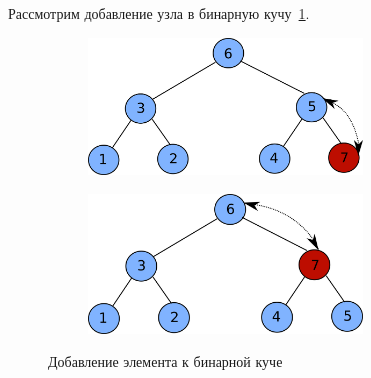 Рассмотрим добавление узла в бинарную кучу~\ref{fig:binary_heap_insertion}.

\begin{figure}
\begin{subfigure}[t]{0.6\textwidth}
	\includegraphics[width=0.8\textwidth]{graphics/binary_heap_insert_1.png}
\end{subfigure}
\begin{subfigure}[t]{0.6\textwidth}
	\includegraphics[width=0.8\textwidth]{graphics/binary_heap_insert_2.png}
\end{subfigure}
\caption{Добавление элемента к бинарной куче}
\label{fig:binary_heap_insertion}
\end{figure}

